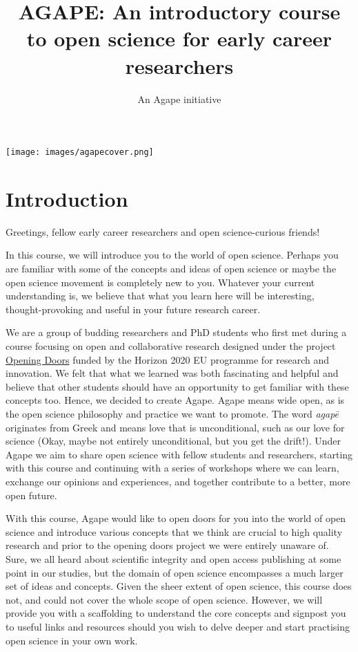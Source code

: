 \documentclass[
]{book}
\title{AGAPE: An introductory course to open science for early career researchers}
\author{An Agape initiative}
\date{}
\begin{document}
\maketitle

{
\setcounter{tocdepth}{1}
\tableofcontents
}
\texttt{[image: images/agapecover.png]}

\hypertarget{introduction}{%
\chapter*{Introduction}\label{introduction}}

Greetings, fellow early career researchers and open science-curious friends!

In this course, we will introduce you to the world of open science. Perhaps you are familiar with some of the concepts and ideas of open science or maybe the open science movement is completely new to you. Whatever your current understanding is, we believe that what you learn here will be interesting, thought-provoking and useful in your future research career.

We are a group of budding researchers and PhD students who first met during a course focusing on open and collaborative research designed under the project {\href{https://openingdoors4phd.eu/project.html}{Opening Doors}} funded by the Horizon 2020 EU programme for research and innovation. We felt that what we learned was both fascinating and helpful and believe that other students should have an opportunity to get familiar with these concepts too. Hence, we decided to create Agape. Agape means wide open, as is the open science philosophy and practice we want to promote. The word \emph{agapē} originates from Greek and means love that is unconditional, such as our love for science (Okay, maybe not entirely unconditional, but you get the drift!). Under Agape we aim to share open science with fellow students and researchers, starting with this course and continuing with a series of workshops where we can learn, exchange our opinions and experiences, and together contribute to a better, more open future.

With this course, Agape would like to open doors for you into the world of open science and introduce various concepts that we think are crucial to high quality research and prior to the opening doors project we were entirely unaware of. Sure, we all heard about scientific integrity and open access publishing at some point in our studies, but the domain of open science encompasses a much larger set of ideas and concepts. Given the sheer extent of open science, this course does not, and could not cover the whole scope of open science. However, we will provide you with a scaffolding to understand the core concepts and signpost you to useful links and resources should you wish to delve deeper and start practising open science in your own work.
\end{document}
